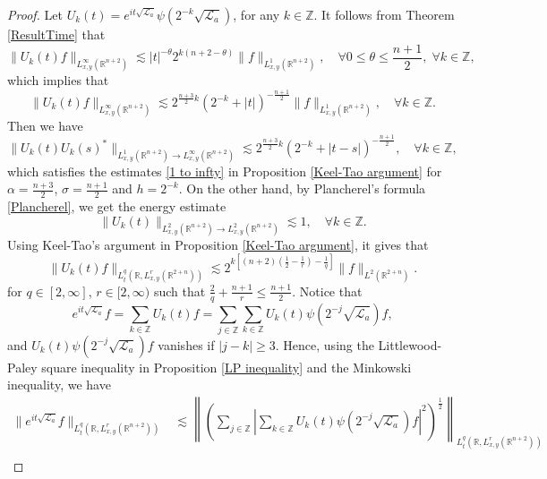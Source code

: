 \documentclass[a4paper,11pt, reqno]{amsart}
\numberwithin{equation}{section}
\theoremstyle{plain}
\theoremstyle{definition}
\theoremstyle{remark}
\begin{document}
\begin{proof} Let $U_k(t)=e^{it\sqrt{\mathcal{L}_a}}\psi(2^{-k}\sqrt{\mathcal{L}_a})$, for any $k\in\mathbb{Z}$.
It follows from Theorem \ref{ResultTime} that
\begin{equation*}
\|U_k(t)f\|_{L^\infty_{x,y}(\mathbb{R}^{n+2})}\lesssim |t|^{-\theta}2^{k(n+2-\theta)}\|f\|_{L^1_{x,y}(\mathbb{R}^{n+2})},\quad \forall 0\leq \theta\leq \frac{n+1}{2},\; \forall k\in\mathbb{Z},
\end{equation*}
which implies that
\begin{equation*}
\|U_k(t)f\|_{L^\infty_{x,y}(\mathbb{R}^{n+2})}\lesssim 2^{\frac{n+3}{2}k}(2^{-k}+|t|)^{-\frac{n+1}{2}}\|f\|_{L^1_{x,y}(\mathbb{R}^{n+2})},\quad \forall k\in\mathbb{Z}.
\end{equation*}
Then we have
\begin{equation*}
\|U_k(t)U_k(s)^*\|_{L^1_{x,y}(\mathbb{R}^{n+2})\rightarrow L^\infty_{x,y}(\mathbb{R}^{n+2})}\lesssim 2^{\frac{n+3}{2}k}(2^{-k}+|t-s|)^{-\frac{n+1}{2}},\quad \forall k\in\mathbb{Z},
\end{equation*}
which satisfies the estimates \eqref{1 to infty} in Proposition \ref{Keel-Tao argument} for $\alpha=\frac{n+3}{2}$, $\sigma=\frac{n+1}{2}$ and $h=2^{-k}$. 
On the other hand, by Plancherel's formula {\color{red} \eqref{Plancherel}}, we get the energy estimate
\begin{equation*}
\|U_k(t)\|_{L^2_{x,y}(\mathbb{R}^{n+2})\rightarrow L^2_{x,y}(\mathbb{R}^{n+2})}\lesssim 1,\quad \forall k\in\mathbb{Z}.
\end{equation*}
Using Keel-Tao's argument in Proposition \ref{Keel-Tao argument}, it gives that
\begin{equation*}
\|U_k(t)f\|_{L_t^q(\mathbb{R},L^r_{x,y}(\mathbb{R}^{2+n}))}\lesssim 2^{k[(n+2)(\frac{1}{2}-\frac{1}{r})-\frac{1}{q}]}\|f\|_{L^2(\mathbb{R}^{2+n})}.
\end{equation*}
for $q\in[2,\infty]$, $r\in [2,\infty)$ such that $\frac{2}{q}+\frac{n+1}{r}\leq \frac{n+1}{2}$. Notice that
\begin{equation*}
e^{it\sqrt{\mathcal{L}_a}}f=\sum_{k\in\mathbb{Z}}U_k(t)f=\sum_{j\in\mathbb{Z}}\sum_{k\in\mathbb{Z}}U_k(t)\psi(2^{-j}\sqrt{\mathcal{L}_a})f,
\end{equation*}
and $U_k(t)\psi(2^{-j}\sqrt{\mathcal{L}_a})f$ vanishes if $|j-k|\geq3$. Hence, using the Littlewood-Paley square inequality in Proposition \ref{LP inequality} and the Minkowski inequality, we have
\begin{align*}
\|e^{it\sqrt{\mathcal{L}_a}}f\|_{L_t^q(\mathbb{R},L^r_{x,y}(\mathbb{R}^{n+2}))}&\lesssim \left\|\left(\sum_{j\in\mathbb{Z}}|\sum_{k\in\mathbb{Z}}U_k(t)\psi(2^{-j}\sqrt{\mathcal{L}_a})f|^2\right)^\frac{1}{2}\right\|_{L_t^q(\mathbb{R},L^r_{x,y}(\mathbb{R}^{n+2}))}\\

\end{align*}
\end{proof}
\end{document}
